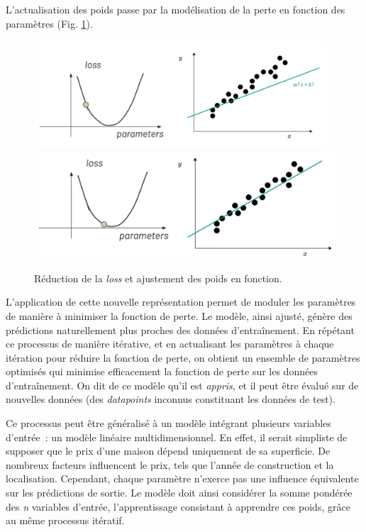L'actualisation des poids passe par la modélisation de la perte en
fonction des paramètres (Fig. \ref{fig:loss2}).

          \begin{figure}[H]
          \begin{center}
          \includegraphics[height=4cm]{figues/modele_lineaire_2.png}
          \includegraphics[height=4cm]{figues/modele_lineaire_3.png}
          \end{center}
          \caption{Réduction de la \emph{loss} et ajustement des poids en fonction.}
          \label{fig:loss2} \end{figure}

L'application de cette nouvelle représentation permet de moduler les
paramètres de manière à minimiser la fonction de perte. Le modèle, ainsi
ajusté, génère des prédictions naturellement plus proches des données
d'entraînement. En répétant ce processus de manière itérative, et en
actualisant les paramètres à chaque itération pour réduire la fonction
de perte, on obtient un ensemble de paramètres optimisés qui minimise
efficacement la fonction de perte sur les données d'entraînement. On dit
de ce modèle qu'il est \emph{appris}, et il peut être évalué sur de
nouvelles données (des \textit{datapoints} inconnus constituant les données de
test).

Ce processus peut être généralisé à un modèle intégrant plusieurs
variables d'entrée~: un modèle linéaire multidimensionnel. En effet, il
serait simpliste de supposer que le prix d'une maison dépend uniquement
de sa superficie. De nombreux facteurs influencent le prix, tels que
l'année de construction et la localisation. Cependant, chaque paramètre
n'exerce pas une influence équivalente sur les prédictions de sortie. Le
modèle doit ainsi considérer la somme pondérée des \emph{n} variables
d'entrée, l'apprentissage consistant à apprendre ces poids, grâce au même processus itératif.

